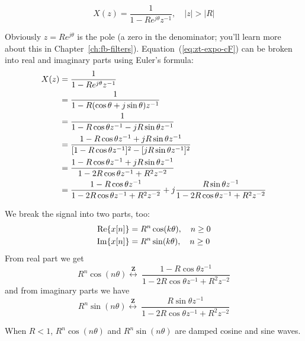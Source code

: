 \begin{equation}
X(z)=\frac{1}{1-Re^{j\theta}z^{-1}}, \quad |z|>|R|
\label{eq:zt-expo-cF}
\end{equation}

Obviously $z=Re^{j\theta}$ is the pole (a zero in the denominator;
you'll learn more about this in
Chapter~\ref{ch:fb-filters}). Equation~(\ref{eq:zt-expo-cF}) can be
broken into real and imaginary parts using Euler's formula:
\begin{align}
X(z) &= \frac{1}{1-Re^{j\theta}z^{-1}} \notag\\
     &= \frac{1}{1-R(\cos\theta+j \sin\theta )z^{-1}} \notag\\
     &= \frac{1}{1-R\cos\theta z^{-1}-j R\sin\theta z^{-1}} \notag\\
     &= \frac{1-R\cos\theta z^{-1}+j R\sin\theta z^{-1}}
     {[1-R\cos\theta z^{-1}]^2 - [jR\sin\theta z^{-1}]^2} \notag\\
     &= \frac{1-R\cos\theta z^{-1}+j R\sin\theta z^{-1}}
     {1-2R\cos\theta z^{-1} + R^2 z^{-2}} \notag\\
     &= \frac{1-R\cos\theta z^{-1}}
     {1-2R\cos\theta z^{-1} + R^2 z^{-2}}
     +j\frac{R\sin\theta z^{-1}}
     {1-2R\cos\theta z^{-1} + R^2 z^{-2}}
\end{align}

We break the signal into two parts, too:
\begin{align}
\operatorname{Re}\{x[n]\} &= R^n\cos(k\theta), \quad n\ge 0\\
\operatorname{Im}\{x[n]\} &= R^n\sin(k\theta), \quad n\ge 0
\end{align}
From real part we get
\begin{equation}
R^n\cos(n\theta)\stackrel{\mathbf{Z}}{\longleftrightarrow} \
\frac{1-R\cos\theta z^{-1}}
{1-2R\cos\theta z^{-1} + R^2 z^{-2}}
\end{equation}
and from imaginary parts we have
\begin{equation}
R^n\sin(n\theta)\stackrel{\mathbf{Z}}{\longleftrightarrow} \
\frac{R\sin\theta z^{-1}}
{1-2R\cos\theta z^{-1} + R^2 z^{-2}}
\end{equation}

When $R<1$, $R^n\cos(n\theta)$ and $R^n\sin(n\theta)$ are damped
cosine and sine waves.


